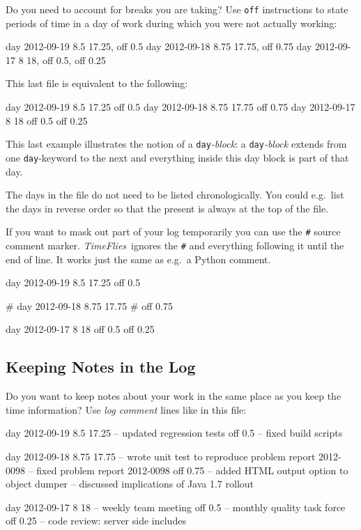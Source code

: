 \documentclass[11pt]{article}
\newcommand{\timeflies}{\emph{TimeFlies}}
\begin{document}
Do you need to account for breaks you are taking? Use \verb-off- instructions to state periods of time in a day of work during which you were not actually working:

\begin{inputfile}
day 2012-09-19 8.5 17.25, off 0.5
day 2012-09-18 8.75 17.75, off 0.75
day 2012-09-17 8 18, off 0.5, off 0.25
\end{inputfile}

This last file is equivalent to the following:

\begin{inputfile}
day 2012-09-19 8.5 17.25
off 0.5
day 2012-09-18 8.75 17.75
off 0.75
day 2012-09-17 8 18
off 0.5
off 0.25
\end{inputfile}

This last example illustrates the notion of a \verb-day-\emph{-block}: a \verb-day-\emph{-block} extends
from one \verb-day--keyword to the next and everything inside this day block is part of that day.

The days in the file do not need to be listed chronologically. You could e.g.\ list the days in reverse order so that the present is always at the top of the file.

If you want to mask out part of your log temporarily you can use the \verb-#- source comment marker. \timeflies\ ignores the \verb-#- and everything following it until the end of line. It works just the same as e.g.\ a Python comment.

\begin{inputfile}
day 2012-09-19 8.5 17.25
off 0.5

# day 2012-09-18 8.75 17.75
# off 0.75

day 2012-09-17 8 18
off 0.5
off 0.25
\end{inputfile}

\subsection{Keeping Notes in the Log}

Do you want to keep notes about your work in the same place as you keep the time information? Use \emph{log comment} lines like in this file:

\begin{inputfile}
day 2012-09-19 8.5 17.25
-- updated regression tests
off 0.5
-- fixed build scripts

day 2012-09-18 8.75 17.75
-- wrote unit test to reproduce problem report 2012-0098
-- fixed problem report 2012-0098
off 0.75
-- added HTML output option to object dumper
-- discussed implications of Java 1.7 rollout

day 2012-09-17 8 18
-- weekly team meeting
off 0.5
-- monthly quality task force 
off 0.25
-- code review: server side includes
\end{inputfile}
\end{document}
